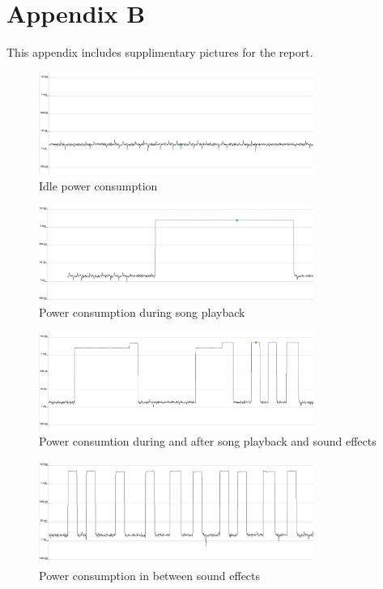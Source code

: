 \section{Appendix B}
\label{appendix:b}

This appendix includes supplimentary pictures for the report.

\begin{figure}[ht!]
    \begin{center}
    \includegraphics[width=0.8\textwidth]{assets/img/idle.png}
    \caption{Idle power consumption}
    \label{fig:idle}
    \end{center}
\end{figure}

\begin{figure}[ht!]
    \begin{center}
    \includegraphics[width=0.8\textwidth]{assets/img/playback_song.png}
    \caption{Power consumption during song playback}
    \label{fig:playback_song}
    \end{center}
\end{figure}

\begin{figure}[ht!]
    \begin{center}
    \includegraphics[width=0.8\textwidth]{assets/img/song_and_sounds.png}
    \caption{Power consumtion during and after song playback and sound effects}
    \label{fig:song_and_songs}
    \end{center}
\end{figure}

\begin{figure}[ht!]
    \begin{center}
    \includegraphics[width=0.8\textwidth]{assets/img/sounds.png}
    \caption{Power consumption in between sound effects}
    \label{fig:sounds}
    \end{center}
\end{figure}
